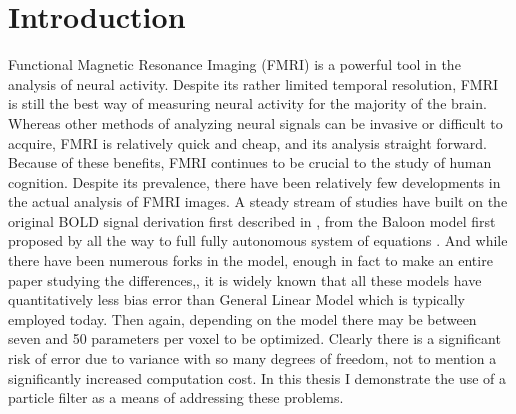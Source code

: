 \documentclass{article}
\begin{document}
\section{Introduction}
Functional Magnetic Resonance Imaging (FMRI) is a powerful tool in the analysis
of neural activity. Despite its rather limited temporal resolution, FMRI is still
the best way of measuring neural activity for the majority of the brain.
Whereas other methods
of analyzing neural signals can be invasive or difficult to acquire, 
FMRI is relatively quick and cheap, and its analysis straight forward.
Because of these benefits, FMRI continues to be crucial to the study of human 
cognition. Despite its prevalence, there have been relatively few developments
in the actual analysis of FMRI images. A steady stream of studies have built
on the original BOLD signal derivation first described in \cite{Ogawa}, 
from the Baloon model first proposed by \cite{Buxton1998}
all the way to full fully autonomous system of equations \cite{Riera2004}. And while
there have been numerous forks in the model, enough in fact to make an entire paper
studying the differences,\cite{Deneux2006}, it is widely known that all these
models have quantitatively less bias error than General Linear Model which is
typically employed today. Then again, depending on the model there may be between
seven \cite{Riera2004} and 50 \cite{Behzadi2005} parameters per voxel to
be optimized. Clearly there is a significant risk of error due to variance
with so many degrees of freedom, not to mention a significantly increased
computation cost. In this thesis I demonstrate the use of a 
particle filter as a means of addressing these problems.
\end{document}
